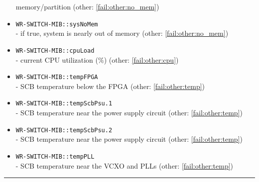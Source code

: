 \begin{itemize}[leftmargin=0pt]
		memory/partition (other: \ref{fail:other:no_mem})
	\item [] \texttt{WR-SWITCH-MIB::sysNoMem}\\ - if true, system is nearly out of
		memory (other: \ref{fail:other:no_mem})
	\item [] \texttt{WR-SWITCH-MIB::cpuLoad}\\ - current CPU utilization (\%)
		(other: \ref{fail:other:cpu})
	\item [] \texttt{WR-SWITCH-MIB::tempFPGA}\\ - SCB temperature below the FPGA
		(other: \ref{fail:other:temp})
	\item [] \texttt{WR-SWITCH-MIB::tempScbPsu.1}\\ - SCB temperature near the
		power supply circuit (other: \ref{fail:other:temp})
	\item [] \texttt{WR-SWITCH-MIB::tempScbPsu.2}\\ - SCB temperature near the
		power supply circuit (other: \ref{fail:other:temp})
	\item [] \texttt{WR-SWITCH-MIB::tempPLL}\\ - SCB temperature near the VCXO and
		PLLs (other: \ref{fail:other:temp})
\end{itemize}

\noindent \rule{\textwidth}{2pt}

%
%
